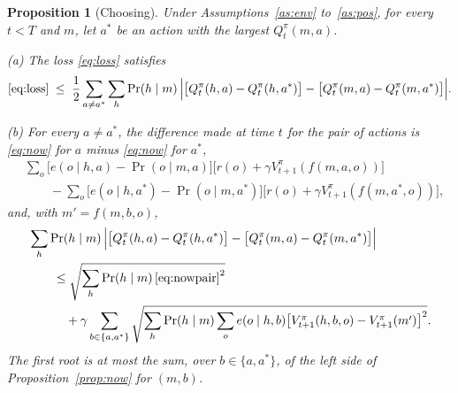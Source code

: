 \documentclass{article}
\newtheorem{proposition}{Proposition}[section]
\theoremstyle{definition}
\numberwithin{equation}{section}
\begin{document}
\begin{proposition}[Choosing]\label{prop:choose}
Under Assumptions~\ref{as:env} to~\ref{as:pos}, for every $t<T$ and $m$, let $a^*$ be an action with the largest $Q^\pi_t(m,a)$.

(a) The loss \eqref{eq:loss} satisfies
\[
\eqref{eq:loss}\;\le\;\frac12\sum_{a\ne a^*}\sum_h\Pr(h\mid m)\,\Big|\big[Q^\pi_t(h,a)-Q^\pi_t(h,a^*)\big]-\big[Q^\pi_t(m,a)-Q^\pi_t(m,a^*)\big]\Big|.
\]

(b) For every $a\ne a^*$, the difference made at time $t$ for the pair of actions is \eqref{eq:now} for $a$ minus \eqref{eq:now} for $a^*$,
\begin{equation}\label{eq:nowpair}
\begin{aligned}
&\sum_o\big[e(o\mid h,a)-\Pr(o\mid m,a)\big]\big[r(o)+\gamma V^\pi_{t+1}(f(m,a,o))\big]\\
&\qquad-\sum_o\big[e(o\mid h,a^*)-\Pr(o\mid m,a^*)\big]\big[r(o)+\gamma V^\pi_{t+1}(f(m,a^*,o))\big],
\end{aligned}
\end{equation}
and, with $m'=f(m,b,o)$,
\begin{align*}
&\sum_h\Pr(h\mid m)\,\Big|\big[Q^\pi_t(h,a)-Q^\pi_t(h,a^*)\big]-\big[Q^\pi_t(m,a)-Q^\pi_t(m,a^*)\big]\Big|\\
&\qquad\le\sqrt{\sum_h\Pr(h\mid m)\,\eqref{eq:nowpair}^2}\\
&\qquad\quad+\gamma\sum_{b\in\{a,a^*\}}\sqrt{\sum_h\Pr(h\mid m)\sum_oe(o\mid h,b)\big[V^\pi_{t+1}(h,b,o)-V^\pi_{t+1}(m')\big]^2}.
\end{align*}
The first root is at most the sum, over $b\in\{a,a^*\}$, of the left side of Proposition~\ref{prop:now} for $(m,b)$.
\end{proposition}
\end{document}
